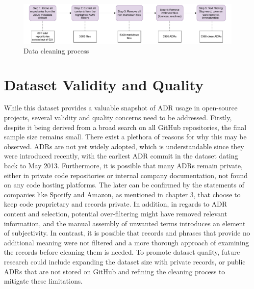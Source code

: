     \begin{figure}[ht]
        \centering
        \includegraphics[width=\textwidth]{figures/data_cleaning_steps_final2.pdf}
        \caption{Data cleaning process}
        \label{fig:Data_cleaning_steps}
    \end{figure}
    
\section{Dataset Validity and Quality}
    While this dataset provides a valuable snapshot of ADR usage in open-source projects, several validity and quality concerns need to be addressed. Firstly, despite it being derived from a broad search on all GitHub repositories, the final sample size remains small. There exist a plethora of reasons for why this may be observed. ADRs are not yet widely adopted, which is understandable since they were introduced recently, with the earliest ADR commit in the dataset dating back to May 2013. Furthermore, it is possible that many ADRs remain private, either in private code repositories or internal company documentation, not found on any code hosting platforms. The later can be confirmed by the statements of companies like Spotify and Amazon, as mentioned in chapter 3, that choose to keep code proprietary and records private.
    In addition, in regards to ADR content and selection, potential over-filtering might have removed relevant information, and the manual assembly of unwanted terms introduces an element of subjectivity. In contrast, it is possible that records and phrases that provide no additional meaning were not filtered and a more thorough approach of examining the records before cleaning them is needed. To promote dataset quality, future research could include expanding the dataset size with private records, or public ADRs that are not stored on GitHub and refining the cleaning process to mitigate these limitations. 